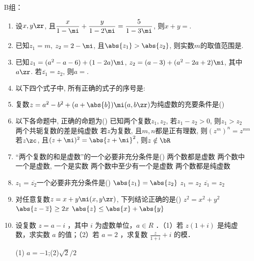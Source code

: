 B组：
\begin{enumerate}
    \item 设$x,y\zr$, 且$\dfrac{x}{1-\mi}+\dfrac{y}{1-2\mi}=\dfrac{5}{1-3\mi}$, 则$x+y=$. 

    \item 已知$z_1=m$, $z_2=2-\mi$, 且$\abs{z_1}>\abs{z_2}$, 则实数$m$的取值范围是. 

    \item 已知$z_1=(a^2-a-6)+(1-2a)\mi$, $z_2=(a-3)+(a^2-2a+2)\mi$, 其中$a\zr$. 若$\overline{z_1}=z_2$, 则$a=$. 

    \item 以下四个式子中, 所有正确的式子的序号是: 

\item 复数$z=a^2-b^2+(a+\abs{b})\mi(a,b\zr)$为纯虚数的充要条件是\dotfill()

\item 以下各命题中, 正确的命题为\dotfill()
\xx
{已知两个复数$z_1,z_2$, 若$z_1-z_2>0$, 则$z_1>z_2$}
{两个共轭复数的差是纯虚数}
{若$z$为复数, 且$m,n$都是正有理数, 则$(z^m)^n=z^{mn}$}
{若$z\zc$, 且$(z+\mi)^2=\abs{z+\mi}^2$, 则$z\notin\bR$}


\item ``两个复数的和是虚数''的一个必要非充分条件是\dotfill()
\xx
{两个数都是虚数}
{两个数中一个是虚数, 一个是实数}
{ 两个数中至少有一个是虚数}
{两个数都是纯虚数}

\item $z_1=\overline{z_2}$一个必要非充分条件是\dotfill()
{$\abs{z_1}=\abs{z_2}$}
{$z_1=z_2$}
{$\overline{z_1}=z_2$}

\item 对任意复数$z=x+y\mi(x,y\zr)$, 下列结论正确的是\dotfill()
{$z^2=x^2+y^2$}
{$\abs{z-\overline{z}}\geq 2x$}
{$\abs{z}\leq\abs{x}+\abs{y}$}

\item 设复数 $z=a-i$ ，其中 $i$ 为虚数单位，$a \in R$ ．（1）若 $z(1+i)$ 是纯虚数，求实数 $a$ 的值；（2）若 $a=2$ ，求复数 $\frac{z}{1+i}+i$ 的模．
\begin{jieda}
    (1) $a=-1$;(2)$\sqrt{2}/2$
\end{jieda}


\end{enumerate}
